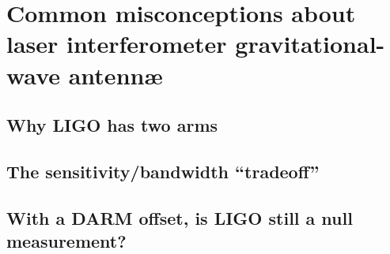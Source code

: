 \chapter{Common misconceptions about laser interferometer gravitational-wave antenn\ae}

\section{Why LIGO has two arms}

\section{The sensitivity/bandwidth ``tradeoff''}

\section{With a DARM offset, is LIGO still a null measurement?}

